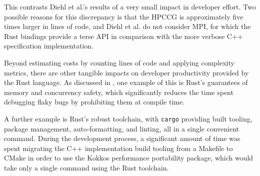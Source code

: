 This contrasts Diehl et al.'s results of a very small impact in developer effort. Two possible reasons for this discrepancy is that the \acrshort{HPCCG} is approximately five times larger in lines of code, and Diehl et al. do not consider MPI, for which the Rust bindings provide a terse API in comparison with the more verbose C++ specification implementation.

Beyond estimating costs by counting lines of code and applying complexity metrics, there are other tangible impacts on developer productivity provided by the Rust language. As discussed in , one example of this is Rust's guarantees of memory and concurrency safety, which significantly reduces the time spent debugging flaky bugs by prohibiting them at compile time.

A further example is Rust's robust toolchain, with \texttt{cargo} providing built tooling, package management, auto-formatting, and linting, all in a single convenient command. During the development process, a significant amount of time was spent migrating the C++ implementation build tooling from a Makefile to CMake in order to use the Kokkos performance portability package, which would take only a single command using the Rust toolchain.
